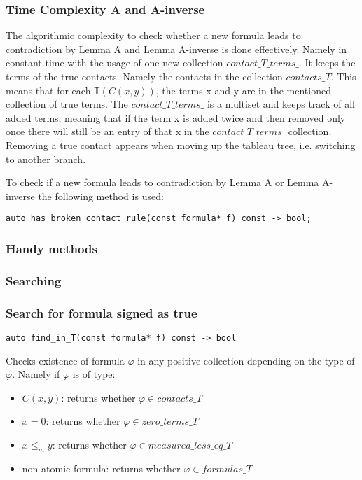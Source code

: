 \documentclass{article}
\begin{document}
	\subsubsection*{Time Complexity A and A-inverse}
	The algorithmic complexity to check whether a new formula leads to contradiction by Lemma A and Lemma A-inverse is done effectively. Namely in constant time with the usage of one new collection $contact\_T\_terms\_$. It keeps the terms of the true contacts. Namely the contacts in the collection $contacts\_T$. This means that for each $\mathbb{T}(C(x, y))$, the terms x and y are in the mentioned collection of true terms. The $contact\_T\_terms\_$  is a multiset and keeps track of all added terms, meaning that if the term x is added twice and then removed only once there will still be an entry of that x in the $contact\_T\_terms\_$ collection. Removing a true contact appears when moving up the tableau tree, i.e. switching to another branch.

	To check if a new formula leads to contradiction by Lemma A or Lemma A-inverse the following method is used:

\begin{lstlisting}
auto has_broken_contact_rule(const formula* f) const -> bool;
\end{lstlisting}

	\subsubsection{Handy methods}
	\subsubsection*{Searching}
	\subsubsection*{Search for formula signed as true}
\begin{lstlisting}
auto find_in_T(const formula* f) const -> bool
\end{lstlisting}
	Checks existence of formula $\varphi$ in any positive collection depending on the type of $\varphi$. Namely if $\varphi$ is of type:
	\begin{itemize}
		\item $C(x, y)$: returns whether $\varphi \in contacts\_T$
		\item $x = 0$: returns whether $\varphi \in zero\_terms\_T$
		\item $x \le_m y$: returns whether $\varphi \in measured\_less\_eq\_T$
		\item non-atomic formula: returns whether $\varphi \in formulas\_T$
	\end{itemize}
\end{document}
